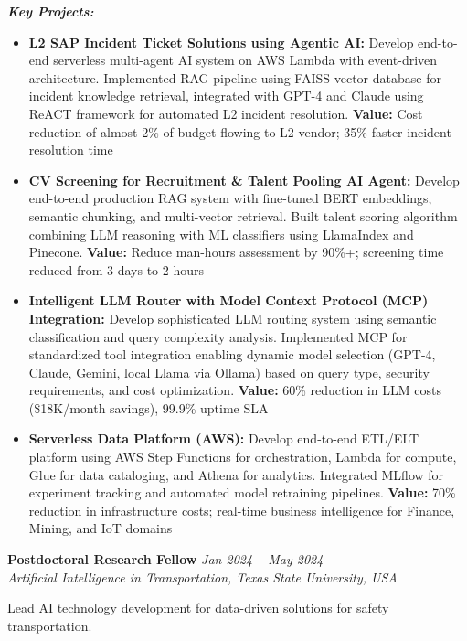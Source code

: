 \documentclass[10pt,a4paper]{article}
\newcommand{\experience}[4]{%
    \noindent\textbf{#1} \hfill \textit{#2}\\
    \textit{#3} \hfill #4\vspace{2pt}
}
\begin{document}
\textit{\textbf{Key Projects:}}
\begin{itemize}
    \item \textbf{L2 SAP Incident Ticket Solutions using Agentic AI:} Develop end-to-end serverless multi-agent AI system on AWS Lambda with event-driven architecture. Implemented RAG pipeline using FAISS vector database for incident knowledge retrieval, integrated with GPT-4 and Claude using ReACT framework for automated L2 incident resolution. \textcolor{accent}{\textbf{Value:}} Cost reduction of almost 2\% of budget flowing to L2 vendor; 35\% faster incident resolution time
    \item \textbf{CV Screening for Recruitment \& Talent Pooling AI Agent:} Develop end-to-end production RAG system with fine-tuned BERT embeddings, semantic chunking, and multi-vector retrieval. Built talent scoring algorithm combining LLM reasoning with ML classifiers using LlamaIndex and Pinecone. \textcolor{accent}{\textbf{Value:}} Reduce man-hours assessment by 90\%+; screening time reduced from 3 days to 2 hours
    \item \textbf{Intelligent LLM Router with Model Context Protocol (MCP) Integration:} Develop sophisticated LLM routing system using semantic classification and query complexity analysis. Implemented MCP for standardized tool integration enabling dynamic model selection (GPT-4, Claude, Gemini, local Llama via Ollama) based on query type, security requirements, and cost optimization. \textcolor{accent}{\textbf{Value:}} 60\% reduction in LLM costs (\$18K/month savings), 99.9\% uptime SLA
    \item \textbf{Serverless Data Platform (AWS):} Develop end-to-end ETL/ELT platform using AWS Step Functions for orchestration, Lambda for compute, Glue for data cataloging, and Athena for analytics. Integrated MLflow for experiment tracking and automated model retraining pipelines. \textcolor{accent}{\textbf{Value:}} 70\% reduction in infrastructure costs; real-time business intelligence for Finance, Mining, and IoT domains
\end{itemize}

\vspace{4pt}

\experience{Postdoctoral Research Fellow}{Jan 2024 -- May 2024}{Artificial Intelligence in Transportation, Texas State University, USA}{}

Lead AI technology development for data-driven solutions for safety transportation.
\end{document}
